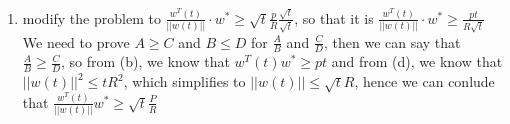 \documentclass{article}
\begin{document}
\begin{enumerate}
\begin{enumerate}[label=(\alph*)]
            \item modify the problem to $\frac{w^T(t)}{||w(t)||} \cdot w^* \geq \sqrt{t} \frac{p}{R} \frac{\sqrt{t}}{\sqrt{t}}$, so that it is $\frac{w^T(t)}{||w(t)||} \cdot w^* \geq \frac{pt}{R\sqrt{t}}$ \\[0.25in]
            We need to prove $A \geq C$ and $B \leq D$ for $\frac{A}{B}$ and $\frac{C}{D}$, then we can say that $\frac{A}{B} \geq \frac{C}{D}$, so from (b), we know that $w^T(t)w^* \geq pt$ and from (d), we know that $||w(t)||^2 \leq tR^2$, which simplifies to $||w(t)|| \leq \sqrt{t}R$, hence we can conlude that $\frac{w^T(t)}{||w(t)||}w^* \geq \sqrt{t} \frac{P}{R}$\\[0.25in]
        \end{enumerate}
    \end{enumerate}
\end{document}

